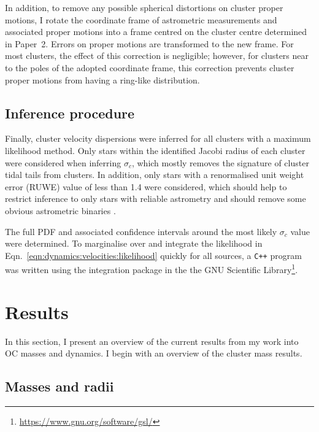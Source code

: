 In addition, to remove any possible spherical distortions on cluster proper motions, I rotate the coordinate frame of astrometric measurements and associated proper motions into a frame centred on the cluster centre determined in Paper~2. Errors on proper motions are transformed to the new frame. For most clusters, the effect of this correction is negligible; however, for clusters near to the poles of the adopted coordinate frame, this correction prevents cluster proper motions from having a ring-like distribution.

\subsection{Inference procedure}
\label{sec:dynamics:velocities:inference}

Finally, cluster velocity dispersions were inferred for all clusters with a maximum likelihood method. Only stars within the identified Jacobi radius of each cluster were considered when inferring $\sigma_c$, which mostly removes the signature of cluster tidal tails from clusters. In addition, only stars with a renormalised unit weight error (RUWE) value of less than 1.4 were considered, which should help to restrict inference to only stars with reliable astrometry and should remove some obvious astrometric binaries \citep{lindegren_gaia_2021,penoyre_astrometric_2022,penoyre_astrometric_2022-1}.

The full PDF and associated confidence intervals around the most likely $\sigma_c$ value were determined. To marginalise over and integrate the likelihood in Eqn.~\ref{eqn:dynamics:velocities:likelihood} quickly for all sources, a \texttt{C++} program was written using the integration package in the the GNU Scientific Library\footnote{\url{https://www.gnu.org/software/gsl/}}.


\section{Results}
\label{sec:dynamics:results}

In this section, I present an overview of the current results from my work into OC masses and dynamics. I begin with an overview of the cluster mass results.


\subsection{Masses and radii}
\label{sec:dynamics:results:masses}

